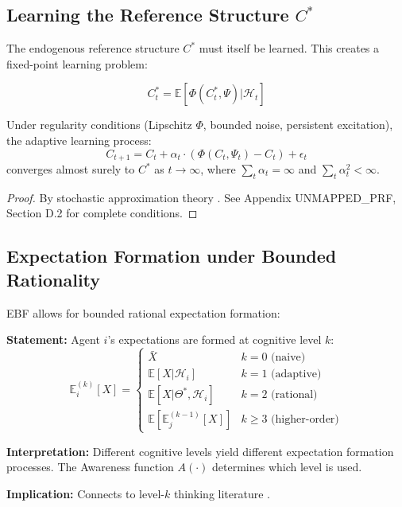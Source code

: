 \subsection{Learning the Reference Structure $C^*$}

The endogenous reference structure $C^*$ must itself be learned. This creates
a fixed-point learning problem:

\begin{equation}
C^*_t = \mathbb{E}[\Phi(C^*_t, \Psi) | \mathcal{H}_t]
\end{equation}

\begin{proposition}
Under regularity conditions (Lipschitz $\Phi$, bounded noise, persistent excitation),
the adaptive learning process:
\begin{equation}
C_{t+1} = C_t + \alpha_t \cdot (\Phi(C_t, \Psi_t) - C_t) + \epsilon_t
\end{equation}
converges almost surely to $C^*$ as $t \to \infty$, where $\sum_t \alpha_t = \infty$
and $\sum_t \alpha_t^2 < \infty$.
\end{proposition}

\begin{proof}
By stochastic approximation theory \citep{benveniste1990adaptive}.
See Appendix UNMAPPED_PRF, Section D.2 for complete conditions.
\end{proof}

\subsection{Expectation Formation under Bounded Rationality}

EBF allows for bounded rational expectation formation:

\begin{tcolorbox}[colback=gray!5!white, colframe=gray!75!black,
    title=Axiom AZ-L2: Hierarchical Expectations]
\textbf{Statement:} Agent $i$'s expectations are formed at cognitive level $k$:
\begin{equation}
\mathbb{E}^{(k)}_i[X] = \begin{cases}
\bar{X} & k = 0 \text{ (naive)} \\
\mathbb{E}[X | \mathcal{H}_i] & k = 1 \text{ (adaptive)} \\
\mathbb{E}[X | \Theta^*, \mathcal{H}_i] & k = 2 \text{ (rational)} \\
\mathbb{E}[\mathbb{E}^{(k-1)}_j[X]] & k \geq 3 \text{ (higher-order)}
\end{cases}
\end{equation}

\textbf{Interpretation:} Different cognitive levels yield different expectation
formation processes. The Awareness function $A(\cdot)$ determines which level is used.

\textbf{Implication:} Connects to level-$k$ thinking literature \citep{stahl1995players,
nagel1995unraveling}.
\end{tcolorbox}


